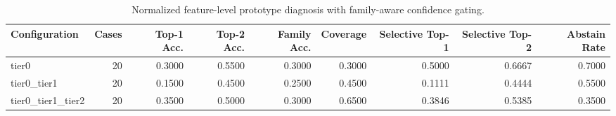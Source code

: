 \begin{table}[t]
\centering
\caption{Normalized feature-level prototype diagnosis with family-aware confidence gating.}
\label{tab:dice_stressor_hierarchical_diagnosis}
\footnotesize
\begin{tabular}{lrrrrrrrr}
\toprule
Configuration & Cases & Top-1 Acc. & Top-2 Acc. & Family Acc. & Coverage & Selective Top-1 & Selective Top-2 & Abstain Rate \\
\midrule
tier0 & 20 & 0.3000 & 0.5500 & 0.3000 & 0.3000 & 0.5000 & 0.6667 & 0.7000 \\
tier0_tier1 & 20 & 0.1500 & 0.4500 & 0.2500 & 0.4500 & 0.1111 & 0.4444 & 0.5500 \\
tier0_tier1_tier2 & 20 & 0.3500 & 0.5000 & 0.3000 & 0.6500 & 0.3846 & 0.5385 & 0.3500 \\
\bottomrule
\end{tabular}

\end{table}
